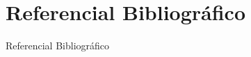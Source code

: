\documentclass{beamer}
\begin{document}
\section{Referencial Bibliográfico}
\begin{frame}{Referencial Bibliográfico}
  
  
\end{frame}



\begin{frame}
\titlepage
\end{frame}
\end{document}
